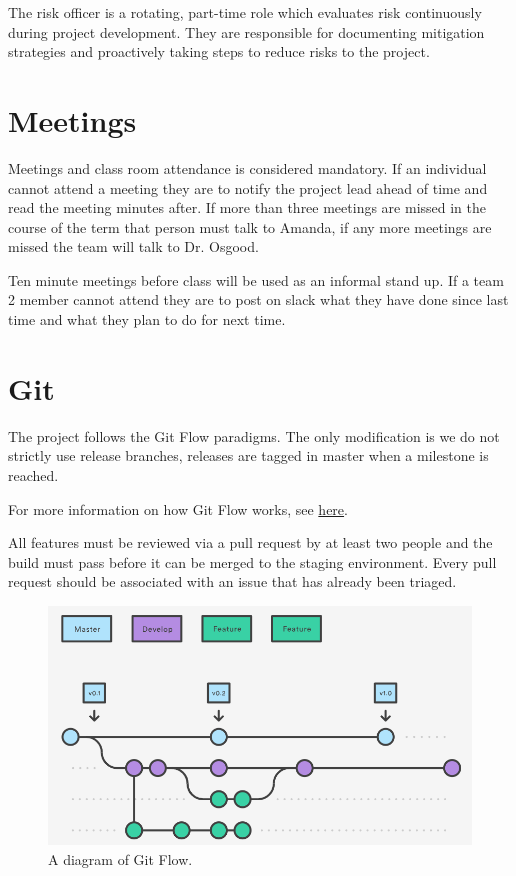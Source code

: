 \documentclass{scrreprt}
\begin{document}
The risk officer is a rotating, part-time role which evaluates
risk continuously during project development. They are responsible
for documenting mitigation strategies and proactively taking
steps to reduce risks to the project. 

\section{Meetings}

Meetings and class room attendance is considered mandatory. 
If an individual cannot attend a meeting they are to notify the project lead ahead of time and read the meeting minutes after. If more than three meetings are missed in the course of the term that person must talk to Amanda, if any more meetings are missed the team will talk to Dr. Osgood.

Ten minute meetings before class will be used as an informal stand up.
If a team 2 member cannot attend they are to post on slack what they have done since last time and what they plan to do for next time. 

\section{Git}

The project follows the Git Flow paradigms. The only
modification is we do not strictly use release branches, releases
are tagged in master when a milestone is reached. 

For more information on how Git Flow works, see \href{https://www.atlassian.com/git/tutorials/comparing-workflows/gitflow-workflow}{here}.

All features must be reviewed via a pull request by at least two
people and the build must pass before it can be merged to the staging
environment. Every pull request should be associated with an issue that
has already been triaged.

\begin{figure}[H]
    \includegraphics[width=\linewidth]{gitflow}
    \caption{A diagram of Git Flow.}
    \label{fig:gitflow}
\end{figure}
\end{document}
